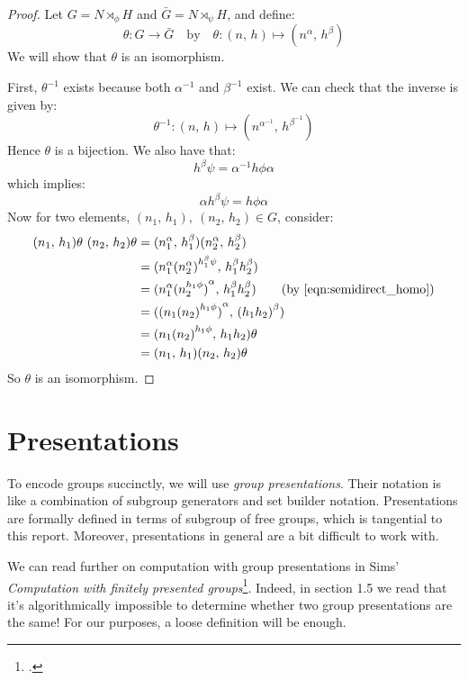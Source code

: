 \begin{proof}
    Let \(G = N \rtimes_\phi H\) and \(\bar{G} = N \rtimes_\psi H\), and define:
    \[\theta:G \to \bar{G} \quad \text{by} \quad \theta:(n,\,h) \mapsto (n^\alpha,\,h^\beta)\]
    We will show that \(\theta\) is an isomorphism.

    First, \(\theta^{-1}\) exists because both \(\alpha^{-1}\) and \(\beta^{-1}\) exist.
    We can check that the inverse is given by:
    \[\theta^{-1}:(n,\,h) \mapsto (n^{\alpha^{-1}},\,h^{\beta^{-1}})\]
    Hence \(\theta\) is a bijection.
    We also have that:
    \[h^\beta\psi = \alpha^{-1}h\phi\alpha\]
    which implies:
    \[\alpha h^\beta\psi = h\phi\alpha \tag{\ast}\label{eqn:semidirect_homo}\]
    Now for two elements, \((n_1,\,h_1),\ (n_2,\,h_2) \in G\), consider:
    \begin{align*}
        (n_1,\, h_1)\theta\ (n_2,\, h_2)\theta &= (n_1^\alpha,\, h_1^\beta)(n_2^\alpha,\, h_2^\beta) \\
        &= (n_1^\alpha {(n_2^\alpha)}^{h_1^\beta\psi},\, h_1^\beta h_2^\beta) \\
        &= (n_1^\alpha {(n_2^{h_1\phi})}^\alpha,\, h_1^\beta h_2^\beta) \tag{by~\ref{eqn:semidirect_homo}} \\
        &= ({(n_1 {(n_2)}^{h_1\phi})}^\alpha,\, {(h_1 h_2)}^\beta) \\
        &= (n_1 {(n_2)}^{h_1\phi},\, h_1 h_2)\theta \\
        &= (n_1,\, h_1)(n_2,\, h_2)\theta
    \end{align*}
    So \(\theta\) is an isomorphism.
\end{proof}


\section{Presentations}
To encode groups succinctly, we will use \emph{group presentations}.
Their notation is like a combination of subgroup generators and set builder notation.
Presentations are formally defined in terms of subgroup of free groups, which is tangential to this report.
Moreover, presentations in general are a bit difficult to work with.

We can read further on computation with group presentations in Sims' \textit{Computation with finitely presented
groups}\footcite{sims1994}.
Indeed, in section 1.5 we read that it's algorithmically impossible to determine whether two group presentations are the same!
For our purposes, a loose definition will be enough.

